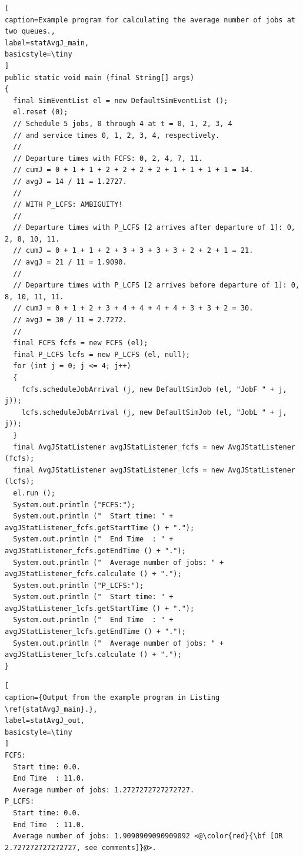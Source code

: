 \documentclass[12pt]{book}
\begin{document}
\begin{lstlisting}[
caption=Example program for calculating the average number of jobs at two queues.,
label=statAvgJ_main,
basicstyle=\tiny
]
public static void main (final String[] args)
{
  final SimEventList el = new DefaultSimEventList ();
  el.reset (0);
  // Schedule 5 jobs, 0 through 4 at t = 0, 1, 2, 3, 4
  // and service times 0, 1, 2, 3, 4, respectively.
  //
  // Departure times with FCFS: 0, 2, 4, 7, 11.
  // cumJ = 0 + 1 + 1 + 2 + 2 + 2 + 2 + 1 + 1 + 1 + 1 = 14.
  // avgJ = 14 / 11 = 1.2727.
  //
  // WITH P_LCFS: AMBIGUITY!
  //
  // Departure times with P_LCFS [2 arrives after departure of 1]: 0, 2, 8, 10, 11.
  // cumJ = 0 + 1 + 1 + 2 + 3 + 3 + 3 + 3 + 2 + 2 + 1 = 21.
  // avgJ = 21 / 11 = 1.9090.
  //
  // Departure times with P_LCFS [2 arrives before departure of 1]: 0, 8, 10, 11, 11.
  // cumJ = 0 + 1 + 2 + 3 + 4 + 4 + 4 + 4 + 3 + 3 + 2 = 30.
  // avgJ = 30 / 11 = 2.7272.    
  //
  final FCFS fcfs = new FCFS (el);
  final P_LCFS lcfs = new P_LCFS (el, null);
  for (int j = 0; j <= 4; j++)
  {
    fcfs.scheduleJobArrival (j, new DefaultSimJob (el, "JobF " + j, j));
    lcfs.scheduleJobArrival (j, new DefaultSimJob (el, "JobL " + j, j));
  }
  final AvgJStatListener avgJStatListener_fcfs = new AvgJStatListener (fcfs);
  final AvgJStatListener avgJStatListener_lcfs = new AvgJStatListener (lcfs);
  el.run ();
  System.out.println ("FCFS:");
  System.out.println ("  Start time: " + avgJStatListener_fcfs.getStartTime () + ".");
  System.out.println ("  End Time  : " + avgJStatListener_fcfs.getEndTime () + ".");
  System.out.println ("  Average number of jobs: " + avgJStatListener_fcfs.calculate () + ".");
  System.out.println ("P_LCFS:");
  System.out.println ("  Start time: " + avgJStatListener_lcfs.getStartTime () + ".");
  System.out.println ("  End Time  : " + avgJStatListener_lcfs.getEndTime () + ".");
  System.out.println ("  Average number of jobs: " + avgJStatListener_lcfs.calculate () + ".");
}
\end{lstlisting}

\begin{lstlisting}[
caption={Output from the example program in Listing \ref{statAvgJ_main}.},
label=statAvgJ_out,
basicstyle=\tiny
]
FCFS:
  Start time: 0.0.
  End Time  : 11.0.
  Average number of jobs: 1.2727272727272727.
P_LCFS:
  Start time: 0.0.
  End Time  : 11.0.
  Average number of jobs: 1.9090909090909092 <@\color{red}{\bf [OR 2.727272727272727, see comments]}@>.
\end{lstlisting}
\end{document}
